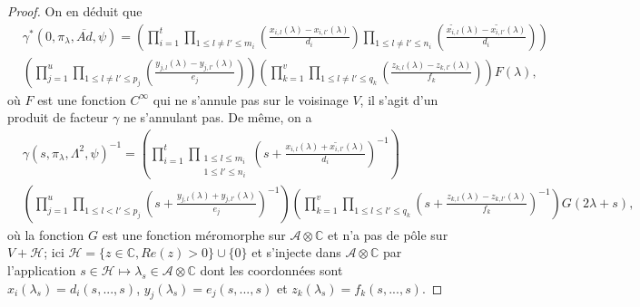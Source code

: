 \documentclass{amsart}
\begin{document}
\begin{proof}
On en déduit que
\begin{equation}
\begin{split}
&\gamma^*(0, \pi_\lambda, \overline{Ad}, \psi) = \left( \prod_{i=1}^t \prod_{1 \leq l \neq l' \leq m_i} (\frac{x_{i,l}(\lambda)-x_{i,l'}(\lambda)}{d_i}) \prod_{1 \leq l \neq l' \leq n_i} (\frac{\widetilde{x_{i,l}}(\lambda)-\widetilde{x_{i,l'}}(\lambda)}{d_i}) \right) \\
& \left( \prod_{j=1}^u \prod_{1 \leq l \neq l' \leq p_j} (\frac{y_{j,l}(\lambda)-y_{j,l'}(\lambda)}{e_j}) \right)
\left( \prod_{k=1}^v \prod_{1 \leq l \neq l' \leq q_k} (\frac{z_{k,l}(\lambda)-z_{k,l'}(\lambda)}{f_k}) \right) F(\lambda),
\end{split}
\end{equation}
où $F$ est une fonction $C^\infty$ qui ne s'annule pas sur le voisinage $V$, il s'agit d'un produit de facteur $\gamma$ ne s'annulant pas. De même, on a
\begin{equation}
\begin{split}
& \gamma(s, \pi_\lambda, \Lambda^2, \psi)^{-1} = \left( \prod_{i=1}^t \prod_{\substack{1 \leq l \leq m_i \\ 1\leq l' \leq n_i}} (s+\frac{x_{i,l}(\lambda)+\widetilde{x_{i,l'}}(\lambda)}{d_i})^{-1} \right) \\ &
\left( \prod_{j=1}^u \prod_{1 \leq l < l' \leq p_j} (s + \frac{y_{j,l}(\lambda)+y_{j,l'}(\lambda)}{e_j})^{-1} \right) 
 \left( \prod_{k=1}^v \prod_{1 \leq l \leq l' \leq q_k} (s+\frac{z_{k,l}(\lambda)-z_{k,l'}(\lambda)}{f_k})^{-1} \right) G(2\lambda+s),
 \end{split}
\end{equation}
où la fonction $G$ est une fonction méromorphe sur $\mathcal{A} \otimes \mathbb{C}$ et n'a pas de pôle sur $V+\mathcal{H}$; ici $\mathcal{H} = \{z \in \mathbb{C}, Re(z) > 0\} \cup \{0\}$ et s'injecte dans $\mathcal{A} \otimes \mathbb{C}$ par l'application $s \in \mathcal{H} \mapsto \lambda_s \in \mathcal{A} \otimes \mathbb{C}$ dont les coordonnées sont $x_i(\lambda_s) = d_i(s, ..., s)$, $y_j(\lambda_s) = e_j(s, ..., s)$ et $z_k(\lambda_s) = f_k(s, ..., s)$.


\end{proof}
\end{document}
